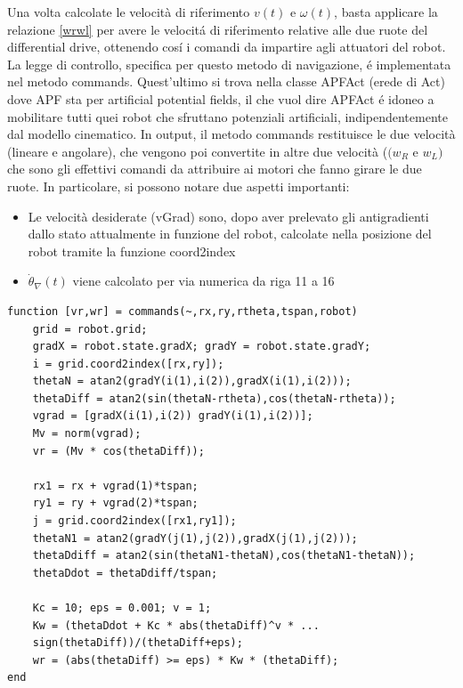 \documentclass[14pt,a4paper]{extarticle}
\begin{document}
Una volta calcolate le velocità di riferimento \(v(t)\) e \(\omega(t)\), basta applicare la relazione \ref{wrwl} per avere le velocitá di riferimento relative alle due ruote del differential drive, ottenendo cosí i comandi da impartire agli attuatori del robot.\\
La legge di controllo, specifica per questo metodo di navigazione, é implementata nel metodo commands. Quest'ultimo si trova nella classe APFAct (erede di Act) dove APF sta per artificial potential fields, il che vuol dire APFAct é idoneo a mobilitare tutti quei robot che sfruttano potenziali artificiali, indipendentemente dal modello cinematico. In output, il metodo commands restituisce le due velocità (lineare e angolare), che vengono poi convertite in altre due velocità (\((w_R\) e \(w_L)\) che sono gli effettivi comandi da attribuire ai motori che fanno girare le due ruote. In particolare, si possono notare due aspetti importanti:
\begin{itemize}
\item Le velocità desiderate (vGrad) sono, dopo aver prelevato gli antigradienti dallo stato attualmente in funzione del robot, calcolate nella posizione del robot tramite la funzione coord2index
\item \(\dot{\theta}_{\nabla}(t)\) viene calcolato per via numerica da riga 11 a 16
\end{itemize}

\begin{lstlisting}
function [vr,wr] = commands(~,rx,ry,rtheta,tspan,robot)
	grid = robot.grid; 
	gradX = robot.state.gradX; gradY = robot.state.gradY;
	i = grid.coord2index([rx,ry]);
	thetaN = atan2(gradY(i(1),i(2)),gradX(i(1),i(2)));
	thetaDiff = atan2(sin(thetaN-rtheta),cos(thetaN-rtheta));
	vgrad = [gradX(i(1),i(2)) gradY(i(1),i(2))];            
	Mv = norm(vgrad);
	vr = (Mv * cos(thetaDiff));
      
	rx1 = rx + vgrad(1)*tspan;
	ry1 = ry + vgrad(2)*tspan;
	j = grid.coord2index([rx1,ry1]);
	thetaN1 = atan2(gradY(j(1),j(2)),gradX(j(1),j(2)));   
	thetaDdiff = atan2(sin(thetaN1-thetaN),cos(thetaN1-thetaN));
	thetaDdot = thetaDdiff/tspan;
	
	Kc = 10; eps = 0.001; v = 1;
	Kw = (thetaDdot + Kc * abs(thetaDiff)^v * ...
	sign(thetaDiff))/(thetaDiff+eps);
	wr = (abs(thetaDiff) >= eps) * Kw * (thetaDiff);
end
\end{lstlisting}

\newpage
\end{document}
